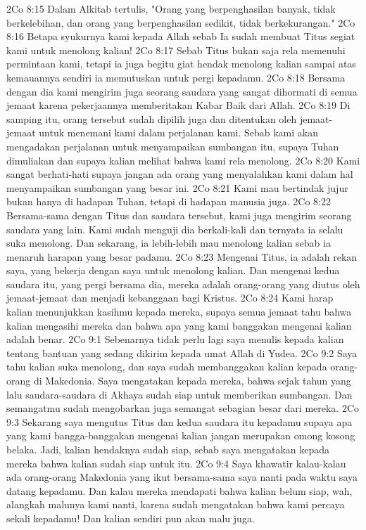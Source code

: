 2Co 8:15  Dalam Alkitab tertulis, "Orang yang berpenghasilan banyak, tidak berkelebihan, dan orang yang berpenghasilan sedikit, tidak berkekurangan."
2Co 8:16  Betapa syukurnya kami kepada Allah sebab Ia sudah membuat Titus segiat kami untuk menolong kalian!
2Co 8:17  Sebab Titus bukan saja rela memenuhi permintaan kami, tetapi ia juga begitu giat hendak menolong kalian sampai atas kemauannya sendiri ia memutuskan untuk pergi kepadamu.
2Co 8:18  Bersama dengan dia kami mengirim juga seorang saudara yang sangat dihormati di semua jemaat karena pekerjaannya memberitakan Kabar Baik dari Allah.
2Co 8:19  Di samping itu, orang tersebut sudah dipilih juga dan ditentukan oleh jemaat-jemaat untuk menemani kami dalam perjalanan kami. Sebab kami akan mengadakan perjalanan untuk menyampaikan sumbangan itu, supaya Tuhan dimuliakan dan supaya kalian melihat bahwa kami rela menolong.
2Co 8:20  Kami sangat berhati-hati supaya jangan ada orang yang menyalahkan kami dalam hal menyampaikan sumbangan yang besar ini.
2Co 8:21  Kami mau bertindak jujur bukan hanya di hadapan Tuhan, tetapi di hadapan manusia juga.
2Co 8:22  Bersama-sama dengan Titus dan saudara tersebut, kami juga mengirim seorang saudara yang lain. Kami sudah menguji dia berkali-kali dan ternyata ia selalu suka menolong. Dan sekarang, ia lebih-lebih mau menolong kalian sebab ia menaruh harapan yang besar padamu.
2Co 8:23  Mengenai Titus, ia adalah rekan saya, yang bekerja dengan saya untuk menolong kalian. Dan mengenai kedua saudara itu, yang pergi bersama dia, mereka adalah orang-orang yang diutus oleh jemaat-jemaat dan menjadi kebanggaan bagi Kristus.
2Co 8:24  Kami harap kalian menunjukkan kasihmu kepada mereka, supaya semua jemaat tahu bahwa kalian mengasihi mereka dan bahwa apa yang kami banggakan mengenai kalian adalah benar.
2Co 9:1  Sebenarnya tidak perlu lagi saya menulis kepada kalian tentang bantuan yang sedang dikirim kepada umat Allah di Yudea.
2Co 9:2  Saya tahu kalian suka menolong, dan saya sudah membanggakan kalian kepada orang-orang di Makedonia. Saya mengatakan kepada mereka, bahwa sejak tahun yang lalu saudara-saudara di Akhaya sudah siap untuk memberikan sumbangan. Dan semangatmu sudah mengobarkan juga semangat sebagian besar dari mereka.
2Co 9:3  Sekarang saya mengutus Titus dan kedua saudara itu kepadamu supaya apa yang kami bangga-banggakan mengenai kalian jangan merupakan omong kosong belaka. Jadi, kalian hendaknya sudah siap, sebab saya mengatakan kepada mereka bahwa kalian sudah siap untuk itu.
2Co 9:4  Saya khawatir kalau-kalau ada orang-orang Makedonia yang ikut bersama-sama saya nanti pada waktu saya datang kepadamu. Dan kalau mereka mendapati bahwa kalian belum siap, wah, alangkah malunya kami nanti, karena sudah mengatakan bahwa kami percaya sekali kepadamu! Dan kalian sendiri pun akan malu juga.
